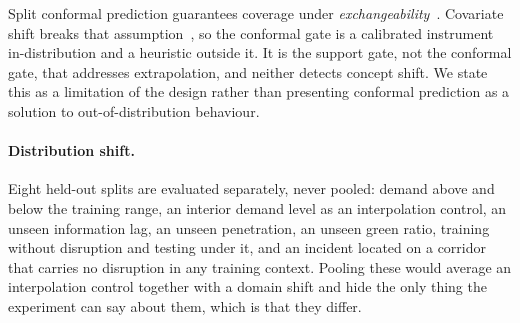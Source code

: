 Split conformal prediction guarantees coverage under
\emph{exchangeability}~\cite{vovk2005alrw,lei2018conformal}. Covariate shift
breaks that assumption~\cite{shimodaira2000,tibshirani2019covshift}, so the
conformal gate is a calibrated instrument in-distribution and a heuristic
outside it. It is the support gate, not the conformal gate, that addresses
extrapolation, and neither detects concept shift. We state this as a limitation
of the design rather than presenting conformal prediction as a solution to
out-of-distribution behaviour.

\paragraph{Distribution shift.} Eight held-out splits are evaluated
separately, never pooled: demand above and below the training range, an
interior demand level as an interpolation control, an unseen information lag, an
unseen penetration, an unseen green ratio, training without disruption and
testing under it, and an incident located on a corridor that carries no
disruption in any training context. Pooling these would average an
interpolation control together with a domain shift and hide the only thing the
experiment can say about them, which is that they differ.
